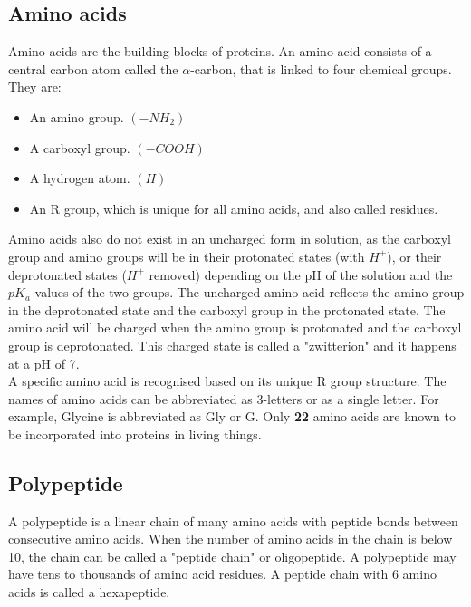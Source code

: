 \documentclass[11pt]{article}
\begin{document}
\newpage

\subsection{Amino acids}
\label{sec:org3a7ba18}
Amino acids are the building blocks of proteins. An amino acid consists of a central carbon atom called the \(\alpha\)-carbon, that is linked to four chemical groups. They are:
\begin{itemize}
\item An amino group. \((-NH_2)\)
\item A carboxyl group. \((-COOH)\)
\item A hydrogen atom. \((H)\)
\item An R group, which is unique for all amino acids, and also called residues.
\end{itemize}

Amino acids also do not exist in an uncharged form in solution, as the carboxyl group and amino groups will be in their protonated states (with \(H^+\)), or their deprotonated states (\(H^+\) removed) depending on the pH of the solution and the \(pK_a\) values of the two groups. The uncharged amino acid reflects the amino group in the deprotonated state and the carboxyl group in the protonated state. The amino acid will be charged when the amino group is protonated and the carboxyl group is deprotonated. This charged state is called a "zwitterion" and it happens at a pH of 7.
\\[0pt]

A specific amino acid is recognised based on its unique R group structure. The names of amino acids can be abbreviated as 3-letters or as a single letter. For example, Glycine is abbreviated as Gly or G. Only \textbf{22} amino acids are known to be incorporated into proteins in living things.

\subsection{Polypeptide}
\label{sec:org5850c1e}
A polypeptide is a linear chain of many amino acids with peptide bonds between consecutive amino acids. When the number of amino acids in the chain is below 10, the chain can be called a "peptide chain" or oligopeptide. A polypeptide may have tens to thousands of amino acid residues. A peptide chain with 6 amino acids is called a hexapeptide.

\newpage
\end{document}
